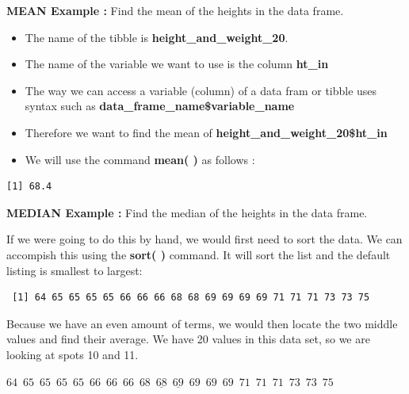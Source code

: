\documentclass[
  letterpaper,
  DIV=11,
  numbers=noendperiod]{scrreprt}
\newenvironment{Shaded}{\begin{snugshade}}{\end{snugshade}}
\newcommand{\FunctionTok}[1]{\textcolor[rgb]{0.28,0.35,0.67}{#1}}
\newcommand{\NormalTok}[1]{\textcolor[rgb]{0.00,0.23,0.31}{#1}}
\newcommand{\SpecialCharTok}[1]{\textcolor[rgb]{0.37,0.37,0.37}{#1}}
\begin{document}
\textbf{MEAN Example :} Find the mean of the heights in the data frame.

\begin{itemize}
\item
  The name of the tibble is \textbf{height\_and\_weight\_20}.
\item
  The name of the variable we want to use is the column \textbf{ht\_in}
\item
  The way we can access a variable (column) of a data fram or tibble
  uses syntax such as \textbf{data\_frame\_name\$variable\_name}
\item
  Therefore we want to find the mean of
  \textbf{height\_and\_weight\_20\$ht\_in}
\item
  We will use the command \textbf{mean( )} as follows :
\end{itemize}

\begin{Shaded}
\end{Shaded}

\begin{verbatim}
[1] 68.4
\end{verbatim}

\textbf{MEDIAN Example :} Find the median of the heights in the data
frame.

If we were going to do this by hand, we would first need to sort the
data. We can accompish this using the \textbf{sort( )} command. It will
sort the list and the default listing is smallest to largest:

\begin{Shaded}
\end{Shaded}

\begin{verbatim}
 [1] 64 65 65 65 65 66 66 66 68 68 69 69 69 69 71 71 71 73 73 75
\end{verbatim}

Because we have an even amount of terms, we would then locate the two
middle values and find their average. We have 20 values in this data
set, so we are looking at spots 10 and 11.

\(64\,\,\, 65\,\,\, 65\,\,\, 65\,\,\, 65\,\,\, 66\,\,\, 66\,\,\, 66\,\,\, 68\,\,\underline{\, 68\,}\,
\underline{\, 69\,}\,\,
69\,\,\, 69\,\,\, 69\,\,\, 71\,\,\, 71\,\,\, 71\,\,\, 73\,\,\, 73\,\,\, 75\)
\end{document}
